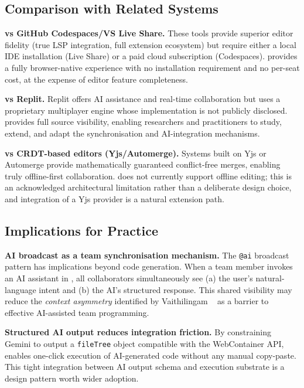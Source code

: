 \subsection{Comparison with Related Systems}

\textbf{vs GitHub Codespaces/VS Live Share.}
These tools provide superior editor fidelity (true LSP integration, full
extension ecosystem) but require either a local IDE installation (Live Share)
or a paid cloud subscription (Codespaces). \echoray{} provides a fully
browser-native experience with no installation requirement and no per-seat
cost, at the expense of editor feature completeness.

\textbf{vs Replit.}
Replit offers AI assistance and real-time collaboration but uses a proprietary
multiplayer engine whose implementation is not publicly disclosed. \echoray{}
provides full source visibility, enabling researchers and practitioners to
study, extend, and adapt the synchronisation and AI-integration mechanisms.

\textbf{vs CRDT-based editors (Yjs/Automerge).}
Systems built on Yjs or Automerge provide mathematically guaranteed
conflict-free merges, enabling truly offline-first collaboration. \echoray{}
does not currently support offline editing; this is an acknowledged
architectural limitation rather than a deliberate design choice, and
integration of a Yjs provider is a natural extension path.

\subsection{Implications for Practice}

\textbf{AI broadcast as a team synchronisation mechanism.}
The \texttt{@ai} broadcast pattern has implications beyond code generation.
When a team member invokes an AI assistant in \echoray{}, all collaborators
simultaneously see (a) the user's natural-language intent and (b) the AI's
structured response. This shared visibility may reduce the \emph{context
asymmetry} identified by Vaithilingam \etal~\cite{vaithilingam2022expectation}
as a barrier to effective AI-assisted team programming.

\textbf{Structured AI output reduces integration friction.}
By constraining Gemini to output a \texttt{fileTree} object compatible with
the WebContainer API, \echoray{} enables one-click execution of AI-generated
code without any manual copy-paste. This tight integration between AI output
schema and execution substrate is a design pattern worth wider adoption.

